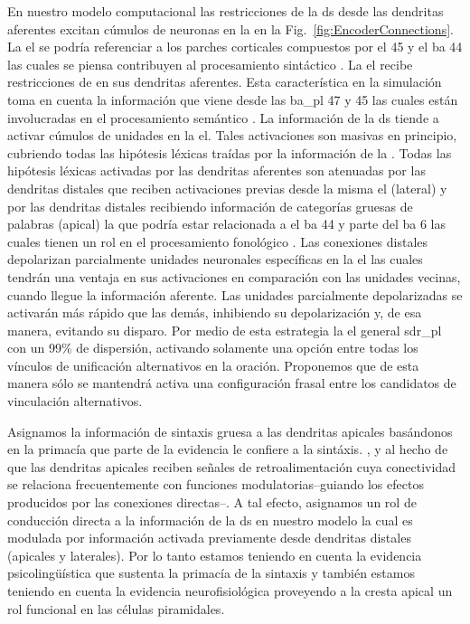 {En nuestro modelo computacional las restricciones de la \gls{ds} desde las dendritas aferentes excitan cúmulos de neuronas en la  en la Fig.~\ref{fig:EncoderConnections}.
La \gls{el} se podría referenciar a los parches corticales compuestos por el  45 y el \gls{ba} 44 las cuales se piensa contribuyen al procesamiento sintáctico \cite{Pallier2522, doi:10.1152/physrev.00006.2011, doi:10.1146/annurev-neuro-071013-013847}.
La \gls{el} recibe restricciones de  en sus dendritas aferentes. Esta característica en la simulación toma en cuenta la información que viene desde las \gls{ba_pl} 47 y 45 las cuales están involucradas en el procesamiento semántico \cite{GOUCHA2015294, DECARLI2007933, PMID:15528098, NEWMAN201051}.
La información de la \gls{ds} tiende a activar cúmulos de unidades en la \gls{el}. Tales activaciones son masivas en principio, cubriendo todas las hipótesis léxicas traídas por la información de la . 
Todas las hipótesis léxicas activadas por las dendritas aferentes son atenuadas por las dendritas distales que reciben activaciones previas desde la misma \gls{el} (lateral) y por las dendritas distales recibiendo información de categorías gruesas de palabras (apical) la que podría estar relacionada a el \gls{ba} 44 y parte del \gls{ba} 6 las cuales tienen un rol en el procesamiento fonológico \cite{Lee3942, PMID:27381836, HEIM2003285, PMID:18296070, AMUNTS200442}.
Las conexiones distales depolarizan parcialmente unidades neuronales específicas en la \gls{el} las cuales tendrán una ventaja en sus activaciones en comparación con las unidades vecinas, cuando llegue la información aferente.
Las unidades parcialmente depolarizadas se activarán más rápido que las demás, inhibiendo su depolarización y, de esa manera, evitando su disparo.
Por medio de esta estrategia la \gls{el} general \gls{sdr_pl} con un 99\% de dispersión, activando solamente una opción entre todas los vínculos de unificación alternativos en la oración. Proponemos que de esta manera sólo se mantendrá activa una configuración frasal entre los candidatos de vinculación alternativos.

Asignamos la información de sintaxis gruesa a las dendritas apicales basándonos en la primacía que parte de la evidencia le confiere a la sintáxis.
\cite{BORNKESSELSCHLESEWSKY200855,doi:10.1111/j.1749-818X.2008.00099.x,FRIEDERICI200278,doi:10.1152/physrev.00006.2011}, y al hecho de que
las dendritas apicales reciben señales de retroalimentación \cite{Spruston2008PyramidalND} cuya conectividad se relaciona frecuentemente con funciones modulatorias--guiando los efectos producidos por las conexiones directas--\cite{news_hidden_2018, marques_functional_2018, Chen2009ForwardAB}.
A tal efecto, asignamos un rol de conducción directa a la información de la \gls{ds} en nuestro modelo la cual es modulada por información activada previamente desde dendritas distales (apicales y laterales).
Por lo tanto estamos teniendo en cuenta la evidencia psicolingüística que sustenta la primacía de la sintaxis y también estamos teniendo en cuenta la evidencia neurofisiológica proveyendo a la cresta apical un rol funcional en las células piramidales.


}
